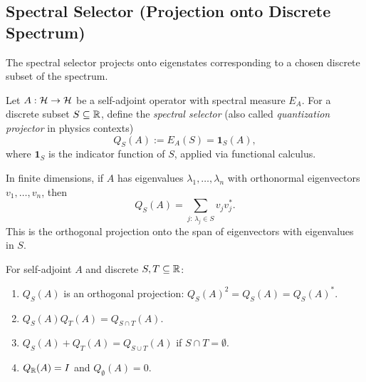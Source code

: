 \subsection{Spectral Selector (Projection onto Discrete Spectrum)}
\label{subsec:quantization}

The spectral selector projects onto eigenstates corresponding to a chosen discrete subset of the spectrum.

\begin{definition}
\label{def:quantization-projector}
Let $A:\mathcal{H} \to \mathcal{H}$ be a self-adjoint operator with spectral measure $E_A$.
For a discrete subset $S \subseteq \mathbb{R}$, define the \emph{spectral selector} (also called \emph{quantization projector} in physics contexts)
\[
Q_S(A) := E_A(S) = \mathbf{1}_S(A),
\]
where $\mathbf{1}_S$ is the indicator function of $S$, applied via functional calculus.
\end{definition}

\begin{remark}
In finite dimensions, if $A$ has eigenvalues $\lambda_1, \ldots, \lambda_n$ with orthonormal eigenvectors $v_1, \ldots, v_n$, then
\[
Q_S(A) = \sum_{j:\, \lambda_j \in S} v_j v_j^*.
\]
This is the orthogonal projection onto the span of eigenvectors with eigenvalues in $S$.
\end{remark}

\begin{proposition}
\label{prop:quantization-properties}
For self-adjoint $A$ and discrete $S, T \subseteq \mathbb{R}$:
\begin{enumerate}[label=(\roman*)]
\item $Q_S(A)$ is an orthogonal projection: $Q_S(A)^2 = Q_S(A) = Q_S(A)^*$.
\item $Q_S(A) Q_T(A) = Q_{S \cap T}(A)$.
\item $Q_S(A) + Q_T(A) = Q_{S \cup T}(A)$ if $S \cap T = \emptyset$.
\item $Q_{\mathbb{R}}(A) = I$ and $Q_\emptyset(A) = 0$.
\end{enumerate}
\end{proposition}

